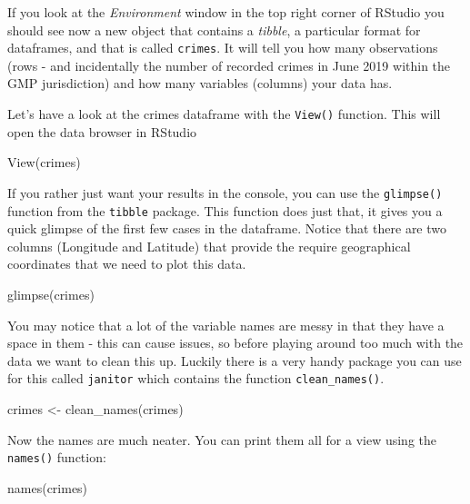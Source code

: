 \documentclass[
]{book}
\newenvironment{Shaded}{\begin{snugshade}}{\end{snugshade}}
\newcommand{\FunctionTok}[1]{\textcolor[rgb]{0.00,0.00,0.00}{#1}}
\newcommand{\NormalTok}[1]{#1}
\newcommand{\OtherTok}[1]{\textcolor[rgb]{0.56,0.35,0.01}{#1}}
\begin{document}
If you look at the \emph{Environment} window in the top right corner of RStudio you should see now a new object that contains a \emph{tibble}, a particular format for dataframes, and that is called \texttt{crimes}. It will tell you how many observations (rows - and incidentally the number of recorded crimes in June 2019 within the GMP jurisdiction) and how many variables (columns) your data has.

Let's have a look at the crimes dataframe with the \texttt{View()} function. This will open the data browser in RStudio

\begin{Shaded}
\begin{Highlighting}[]
\FunctionTok{View}\NormalTok{(crimes)}
\end{Highlighting}
\end{Shaded}

If you rather just want your results in the console, you can use the \texttt{glimpse()} function from the \texttt{tibble} package. This function does just that, it gives you a quick glimpse of the first few cases in the dataframe. Notice that there are two columns (Longitude and Latitude) that provide the require geographical coordinates that we need to plot this data.

\begin{Shaded}
\begin{Highlighting}[]
\FunctionTok{glimpse}\NormalTok{(crimes)}
\end{Highlighting}
\end{Shaded}

You may notice that a lot of the variable names are messy in that they have a space in them - this can cause issues, so before playing around too much with the data we want to clean this up. Luckily there is a very handy package you can use for this called \texttt{janitor} which contains the function \texttt{clean\_names()}.

\begin{Shaded}
\begin{Highlighting}[]
\NormalTok{crimes }\OtherTok{\textless{}{-}} \FunctionTok{clean\_names}\NormalTok{(crimes)}
\end{Highlighting}
\end{Shaded}

Now the names are much neater. You can print them all for a view using the \texttt{names()} function:

\begin{Shaded}
\begin{Highlighting}[]
\FunctionTok{names}\NormalTok{(crimes)}
\end{Highlighting}
\end{Shaded}
\end{document}
